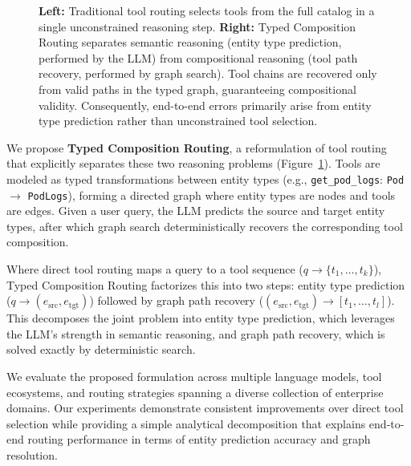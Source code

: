 \begin{figure}[t]

\caption{
\textbf{Left:} Traditional tool routing selects tools from the full catalog in a single unconstrained reasoning step.
\textbf{Right:} Typed Composition Routing separates semantic reasoning (entity type prediction, performed by the LLM) from compositional reasoning (tool path recovery, performed by graph search). Tool chains are recovered only from valid paths in the typed graph, guaranteeing compositional validity. Consequently, end-to-end errors primarily arise from entity type prediction rather than unconstrained tool selection.
}

\label{fig:approach}
\end{figure}

We propose \textbf{Typed Composition Routing}, a reformulation of tool routing that explicitly separates these two reasoning problems (Figure~\ref{fig:approach}). Tools are modeled as typed transformations between entity types (e.g., \texttt{get\_pod\_logs}: \texttt{Pod} $\rightarrow$ \texttt{PodLogs}), forming a directed graph where entity types are nodes and tools are edges. Given a user query, the LLM predicts the source and target entity types, after which graph search deterministically recovers the corresponding tool composition.

Where direct tool routing maps a query to a tool sequence ($q \rightarrow \{t_1, \ldots, t_k\}$), Typed Composition Routing factorizes this into two steps: entity type prediction ($q \rightarrow (e_{\mathrm{src}}, e_{\mathrm{tgt}})$) followed by graph path recovery ($(e_{\mathrm{src}}, e_{\mathrm{tgt}}) \rightarrow [t_1, \ldots, t_l]$).
This decomposes the joint problem into entity type prediction, which leverages the LLM's strength in semantic reasoning, and graph path recovery, which is solved exactly by deterministic search.

We evaluate the proposed formulation across multiple language models, tool ecosystems, and routing strategies spanning a diverse collection of enterprise domains. Our experiments demonstrate consistent improvements over direct tool selection while providing a simple analytical decomposition that explains end-to-end routing performance in terms of entity prediction accuracy and graph resolution.

